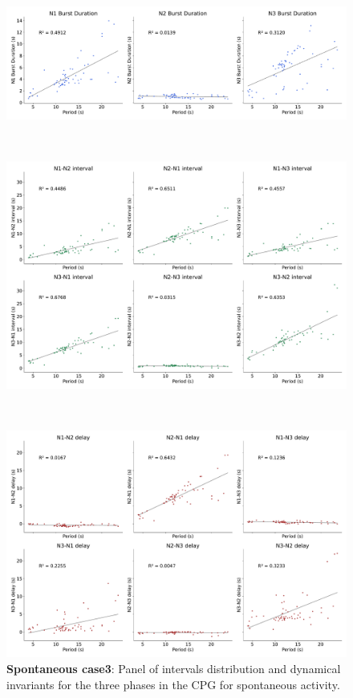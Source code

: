 \begin{figure}[htbp]
\begin{minipage}[b]{0.53\textwidth}
		\begin{minipage}[b]{\textwidth}
			\centering
			\includegraphics[width=\textwidth]{./invariants/data/SUSSEX/prep3/images/prep3_3phases_durations.pdf}
		\end{minipage}\\
		\begin{minipage}[b]{\textwidth}
			\centering
			\includegraphics[width=\textwidth]{./invariants/data/SUSSEX/prep3/images/prep3_3phases_intervals.pdf}
		\end{minipage}\\
		\begin{minipage}[b]{\textwidth}
			\centering
			\includegraphics[width=\textwidth]{./invariants/data/SUSSEX/prep3/images/prep3_3phases_delays.pdf}
		\end{minipage}
	\end{minipage}
	\caption{\textbf{Spontaneous case3}: Panel of intervals distribution and dynamical invariants for the three phases in the CPG for spontaneous activity.}
	\label{fig:prep3 invariants}
\end{figure}



